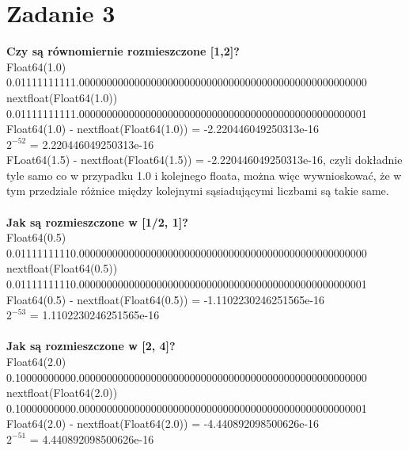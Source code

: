 \documentclass{article}
\begin{document}
\section*{Zadanie 3}
\textbf{Czy są równomiernie rozmieszczone [1,2]?\\}
Float64(1.0)\\
0.01111111111.0000000000000000000000000000000000000000000000000000\\
nextfloat(Float64(1.0))\\
0.01111111111.0000000000000000000000000000000000000000000000000001\\
Float64(1.0) - nextfloat(Float64(1.0)) = -2.220446049250313e-16\\
${2^{-52}}$ = 2.220446049250313e-16\\
FLoat64(1.5) - nextfloat(Float64(1.5)) = -2.220446049250313e-16, czyli dokładnie tyle samo co w przypadku 1.0 i kolejnego floata, można więc wywnioskować, że w tym przedziale różnice między kolejnymi sąsiadującymi liczbami są takie same.\\
\\
\textbf{Jak są rozmieszczone w [1/2, 1]?\\}
Float64(0.5)\\
0.01111111110.0000000000000000000000000000000000000000000000000000\\
nextfloat(Float64(0.5))\\
0.01111111110.0000000000000000000000000000000000000000000000000001\\
Float64(0.5) - nextfloat(Float64(0.5)) = -1.1102230246251565e-16\\
${2^{-53}}$ = 1.1102230246251565e-16\\
\\
\textbf{Jak są rozmieszczone w [2, 4]?\\}
Float64(2.0)\\
0.10000000000.0000000000000000000000000000000000000000000000000000\\
nextfloat(Float64(2.0))\\
0.10000000000.0000000000000000000000000000000000000000000000000001\\
Float64(2.0) - nextfloat(Float64(2.0)) = -4.440892098500626e-16\\
${2^{-51}}$ = 4.440892098500626e-16\\
\end{document}
